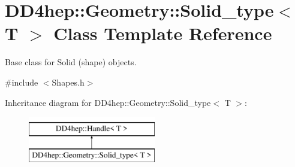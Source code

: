\hypertarget{class_d_d4hep_1_1_geometry_1_1_solid__type}{}\section{D\+D4hep\+:\+:Geometry\+:\+:Solid\+\_\+type$<$ T $>$ Class Template Reference}
\label{class_d_d4hep_1_1_geometry_1_1_solid__type}


Base class for Solid (shape) objects.  




{\ttfamily \#include $<$Shapes.\+h$>$}

Inheritance diagram for D\+D4hep\+:\+:Geometry\+:\+:Solid\+\_\+type$<$ T $>$\+:\begin{figure}[H]
\begin{center}
\leavevmode
\includegraphics[height=2.000000cm]{class_d_d4hep_1_1_geometry_1_1_solid__type}
\end{center}
\end{figure}
